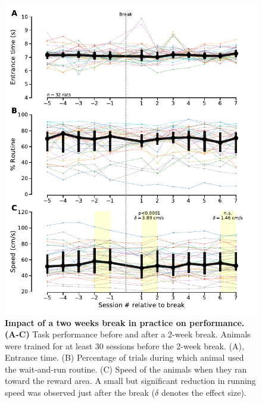 \begin{figure}[bth!]
  \begin{center}
    \includegraphics[width=1\linewidth]{ch-appendicies/figures/BreakEffect.pdf}
    \caption
    {\textbf{Impact of a two weeks break in practice on performance.}
    \textbf{(A-C)} Task performance before and after a 2-week break. Animals were trained for at least 30 sessions before the 2-week break. (A), Entrance time. (B) Percentage of trials during which animal used the wait-and-run routine. (C) Speed of the animals when they ran toward the reward area. A small but significant reduction in running speed was observed just after the break ($\delta$ denotes the effect size).
    }
    \label{fig:appendix:break}
  \end{center}
\end{figure}